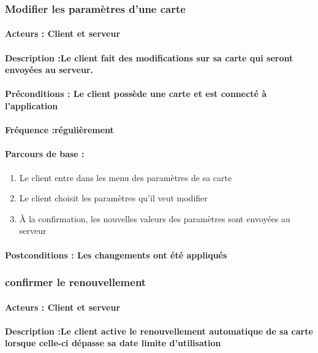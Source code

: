 \documentclass[../annexe.tex]{subfiles}
\begin{document}
\subsubsection{Modifier les paramètres d'une carte}
\paragraph{Acteurs : Client et serveur}
\paragraph{Description :Le client fait des modifications sur sa carte qui seront envoyées au serveur.} 
\paragraph{Préconditions : Le client possède une carte et est connecté à l'application}
\paragraph{Fréquence :régulièrement}
\paragraph{Parcours de base :}
\begin{enumerate}
	\item{Le client entre dans les menu des paramètres de sa carte}
	\item{Le client choisit les paramètres qu'il veut modifier}
	\item{À la confirmation, les nouvelles valeurs des paramètres sont envoyées au serveur}
\end{enumerate}
\paragraph{Postconditions : Les changements ont été appliqués}

\subsubsection{confirmer le renouvellement}
\paragraph{Acteurs : Client et serveur}
\paragraph{Description :Le client active le renouvellement automatique de sa carte lorsque celle-ci dépasse sa date limite d'utilisation} 
\end{document}
